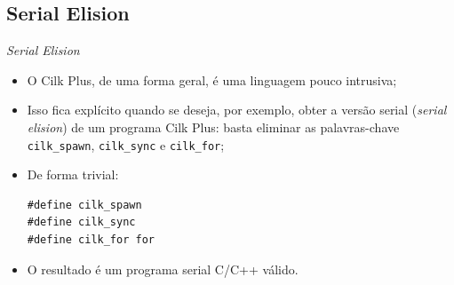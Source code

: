\documentclass{beamer}
\begin{document}
\subsection{Serial Elision}
\begin{frame}[fragile]{\textit{Serial Elision}}
\begin{itemize}
    \item O Cilk Plus, de uma forma geral, é uma linguagem pouco intrusiva;
    \item Isso fica explícito quando se deseja, por exemplo, obter a versão
    serial (\textit{serial elision}) de um programa Cilk Plus: basta eliminar as
    palavras-chave \texttt{cilk\_spawn}, \texttt{cilk\_sync} e
    \texttt{cilk\_for};
    \item De forma trivial:
\begin{lstlisting}
#define cilk_spawn
#define cilk_sync
#define cilk_for for
\end{lstlisting}
    \item O resultado é um programa serial C/C++ válido.
\end{itemize}
\end{frame}
\end{document}
